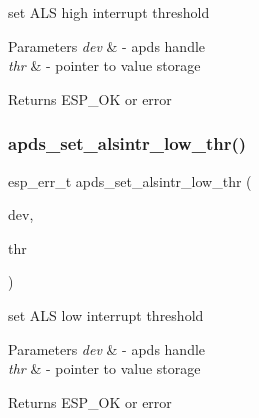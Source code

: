 \begin{DoxyItemize}
\item set A\+LS high interrupt threshold 
\end{DoxyItemize}


\begin{DoxyParams}{Parameters}
{\em dev} & -\/ apds handle \\
\hline
{\em thr} & -\/ pointer to value storage \\
\hline
\end{DoxyParams}
\begin{DoxyReturn}{Returns}
E\+S\+P\+\_\+\+OK or error 
\end{DoxyReturn}
\mbox{\label{group__APDS9960__ALSFunctions_ga2e55ac0eb17c3893d4da292ffee730ee}} 
\subsubsection{\texorpdfstring{apds\+\_\+set\+\_\+alsintr\+\_\+low\+\_\+thr()}{apds\_set\_alsintr\_low\_thr()}}
{\footnotesize\ttfamily esp\+\_\+err\+\_\+t apds\+\_\+set\+\_\+alsintr\+\_\+low\+\_\+thr (\begin{DoxyParamCaption}\item[{\hyperlink{structAPDS9960__Driver}{A\+P\+D\+S\+\_\+\+D\+EV}}]{dev,  }\item[{\hyperlink{vl53l0x__types_8h_a273cf69d639a59973b6019625df33e30}{uint16\+\_\+t} $\ast$}]{thr }\end{DoxyParamCaption})}




\begin{DoxyItemize}
\item set A\+LS low interrupt threshold 
\end{DoxyItemize}


\begin{DoxyParams}{Parameters}
{\em dev} & -\/ apds handle \\
\hline
{\em thr} & -\/ pointer to value storage \\
\hline
\end{DoxyParams}
\begin{DoxyReturn}{Returns}
E\+S\+P\+\_\+\+OK or error 
\end{DoxyReturn}
